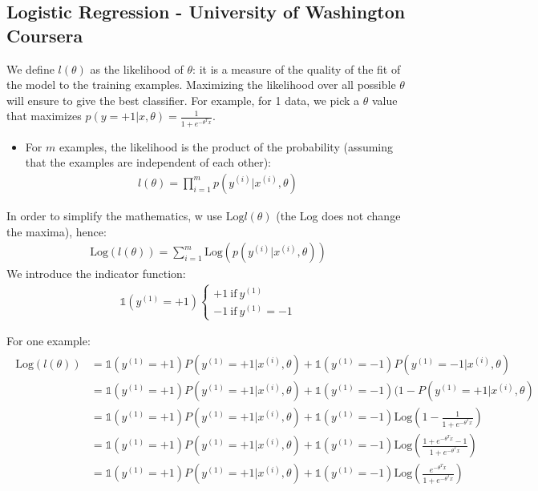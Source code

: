 \documentclass[a4paper,12pt]{report}
\begin{document}
\begin{appendices}
\section{Logistic Regression - University of Washington Coursera}
We define $l(\theta)$ as the likelihood of $\theta$: it is a measure of the quality of the fit of the model to the training examples. Maximizing the likelihood over all possible $\theta$ will ensure to give the best classifier. For example, for 1 data, we pick a $\theta$ value that maximizes $p(y=+1|x,\theta) = \frac{1}{1+e^{-\theta^T x}}$.
\begin{itemize}
\item For $m$ examples, the likelihood is the product of the probability (assuming that the examples are independent of each other):
\begin{align*}
l(\theta) = \prod_{i=1} ^m p(y^{(i)}|x^{(i)},\theta)
\end{align*}
\end{itemize}

In order to simplify the mathematics, w use $\mathrm{Log} l(\theta)$ (the Log does not change the maxima), hence:
\begin{align*}
\mathrm{Log}(l(\theta)) = \sum_{i=1} ^m \mathrm{Log}(p(y^{(i)}|x^{(i)},\theta))
\end{align*}
We introduce the indicator function:
\begin{align}
\mathds{1}(y^{(1)}=+1)
	\begin{cases}
	+1 \mathrm{\ if \ } y^{(1)}  \\
	-1  \mathrm{\ if \ } y^{(1)} = -1
	\end{cases}
\end{align}

For one example:
\begin{align}
\begin{split}
\mathrm{Log}(l(\theta)) &= \mathds{1}(y^{(1)}=+1) P(y^{(1)}=+1|x^{(i)},\theta) + \mathbb{1}(y^{(1)}=-1) P(y^{(1)}=-1|x^{(i)},\theta) \\
&= \mathds{1}(y^{(1)}=+1) P(y^{(1)}=+1|x^{(i)},\theta) + \mathds{1}(y^{(1)}=-1) (1-P(y^{(1)}=+1|x^{(i)},\theta) \\
&=\mathds{1}(y^{(1)}=+1) P(y^{(1)}=+1|x^{(i)},\theta) + \mathds{1}(y^{(1)}=-1) \mathrm{Log}\left(1-\frac{1}{1+e^{-\theta^T x}} \right) \\
&=\mathds{1}(y^{(1)}=+1) P(y^{(1)}=+1|x^{(i)},\theta) + \mathds{1}(y^{(1)}=-1) \mathrm{Log}\left(\frac{1 + e^{-\theta^T x} -1}{1+e^{-\theta^T x}} \right) \\
&=\mathds{1}(y^{(1)}=+1) P(y^{(1)}=+1|x^{(i)},\theta) + \mathds{1}(y^{(1)}=-1) \mathrm{Log}\left(\frac{e^{-\theta^T x}}{1+e^{-\theta^T x}} \right) \\
\end{split}
\end{align}


\end{appendices}
\end{document}
